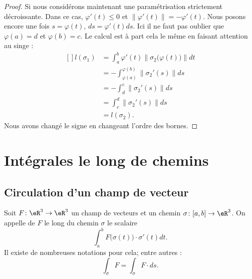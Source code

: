 \begin{proof}
    Si nous considérons maintenant une paramétrisation strictement décroissante. Dans ce cas, $\varphi'(t)\leq 0$ et $\| \varphi'(t) \|=-\varphi'(t)$. Nous posons encore une fois $s=\varphi(t)$, $ds=\varphi'(t)ds$. Ici il ne faut pas oublier que $\varphi(a)=d$ et $\varphi(b)=c$. Le calcul est à part cela le même en faisant attention au singe :
    \begin{equation}
        \begin{aligned}[]
            l(\sigma_1)&=\int_a^b\varphi'(t)\| \sigma_2\big( \varphi(t) \big) \|dt\\
            &=-\int_{\varphi(a)}^{\varphi(b)}\| \sigma_2'(s) \|ds\\
            &=-\int_d^c\| \sigma_2'(s) \|ds\\
            &=\int_c^d\| \sigma_2'(s) \|ds\\
            &=l(\sigma_2).
        \end{aligned}
    \end{equation}
    Nous avons changé le signe en changeant l'ordre des bornes.
\end{proof}

\section{Intégrales le long de chemins}

\subsection{Circulation d'un champ de vecteur}

\begin{definition}
    Soit $F\colon \eR^3\to \eR^3$ un champ de vecteurs et un chemin $\sigma\colon \mathopen[ a , b \mathclose]\to \eR^3$. On appelle  de $F$ le long du chemin $\sigma$ le scalaire
    \begin{equation}        \label{EqDeffvkZwhOM}
        \int_a^b F\big( \sigma(t) \big)\cdot \sigma'(t)dt.
    \end{equation}
    Il existe de nombreuses notations pour cela; entre autres :
    \begin{equation}
        \int_{\sigma}F=\int_{\sigma} F\cdot ds.
    \end{equation}
\end{definition}

